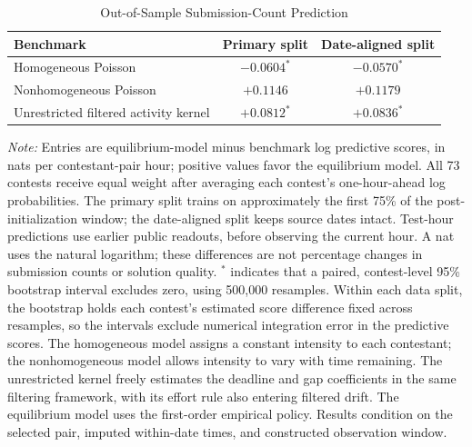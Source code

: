 \documentclass[mnsc]{informs3}
\newcommand{\figtabnotesize}{\TableSpaced\footnotesize}
\begin{document}
\begin{APPENDICES}
\begin{table}[!htbp]
\centering
\caption{Out-of-Sample Submission-Count Prediction}
\label{tab-submission-prediction}
\small
\begin{tabularx}{\textwidth}{>{\raggedright\arraybackslash}Xcc}
\toprule
Benchmark & Primary split & Date-aligned split\\
\midrule
Homogeneous Poisson & $-0.0604^{*}$ & $-0.0570^{*}$\\
Nonhomogeneous Poisson & $+0.1146$ & $+0.1179$\\
Unrestricted filtered activity kernel & $+0.0812^{*}$ & $+0.0836^{*}$\\
\bottomrule
\end{tabularx}
\par\vspace{0.5ex}
\begin{minipage}{\textwidth}\figtabnotesize
\footnotesize\textit{Note:} Entries are equilibrium-model minus benchmark log predictive scores, in nats per contestant-pair hour; positive values favor the equilibrium model. All 73 contests receive equal weight after averaging each contest's one-hour-ahead log probabilities. The primary split trains on approximately the first 75\% of the post-initialization window; the date-aligned split keeps source dates intact. Test-hour predictions use earlier public readouts, before observing the current hour. A nat uses the natural logarithm; these differences are not percentage changes in submission counts or solution quality. $^{*}$ indicates that a paired, contest-level 95\% bootstrap interval excludes zero, using 500,000 resamples. Within each data split, the bootstrap holds each contest’s estimated score difference fixed across resamples, so the intervals exclude numerical integration error in the predictive scores. The homogeneous model assigns a constant intensity to each contestant; the nonhomogeneous model allows intensity to vary with time remaining. The unrestricted kernel freely estimates the deadline and gap coefficients in the same filtering framework, with its effort rule also entering filtered drift. The equilibrium model uses the first-order empirical policy. Results condition on the selected pair, imputed within-date times, and constructed observation window.
\end{minipage}
\end{table}

\end{APPENDICES}
\end{document}
